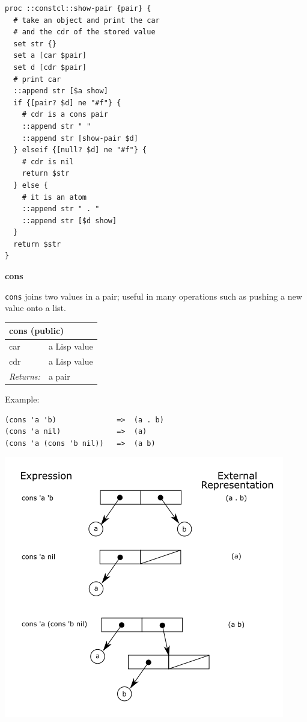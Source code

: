 \documentclass[twoside,9pt]{report}
\begin{document}
\noindent\makebox[\linewidth]{\rule{\linewidth}{0.4pt}}
\begin{lstlisting}
proc ::constcl::show-pair {pair} {
  # take an object and print the car
  # and the cdr of the stored value
  set str {}
  set a [car $pair]
  set d [cdr $pair]
  # print car
  ::append str [$a show]
  if {[pair? $d] ne "#f"} {
    # cdr is a cons pair
    ::append str " "
    ::append str [show-pair $d]
  } elseif {[null? $d] ne "#f"} {
    # cdr is nil
    return $str
  } else {
    # it is an atom
    ::append str " . "
    ::append str [$d show]
  }
  return $str
}
\end{lstlisting}
\noindent\makebox[\linewidth]{\rule{\linewidth}{0.4pt}}

\textbf{cons}


\texttt{cons} joins two values in a pair; useful in many operations such as pushing a new value onto a list.

\begin{tabular}{ |l l| }
\hline
\multicolumn{2}{|l|}{cons (public)} \\
\hline
car & a Lisp value \\
cdr & a Lisp value \\
\textit{Returns:} & a pair \\
\hline
\end{tabular}


Example:

\noindent\makebox[\linewidth]{\rule{\linewidth}{0.4pt}}
\begin{lstlisting}
(cons 'a 'b)              =>  (a . b)
(cons 'a nil)             =>  (a)
(cons 'a (cons 'b nil))   =>  (a b)
\end{lstlisting}
\noindent\makebox[\linewidth]{\rule{\linewidth}{0.4pt}}

\includegraphics{images/consing.png}
\end{document}
